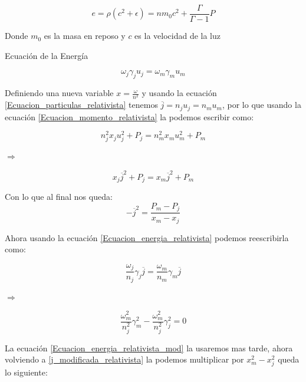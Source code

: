 \documentclass[12pt,a4paper]{book}
\begin{document}
\begin{equation}\label{Energia_densidad_fluido}
e = \rho \left( c^2+ \epsilon \right)= nm_{0}c^{2} + \frac{\Gamma}{\Gamma -1}P
\end{equation}

Donde $m_0$ es la masa en reposo y $c$ es la velocidad de la luz

Ecuación de la Energía

\begin{equation}\label{Ecuacion_energia_relativista}
\omega_j \gamma_j u_j=\omega_m \gamma_m u_m
\end{equation}

Definiendo una nueva variable $x=\frac{\omega}{n^{2}}$ y usando la ecuación \ref{Ecuacion_particulas_relativista} tenemos $\overline{j}=n_j u_j = n_m u_m$, por lo que usando  la ecuación \ref{Ecuacion_momento_relativista} la podemos escribir como:

\begin{equation*}
n_{j}^2 x_{j} u_{j}^{2} + P_{j}
=
n_{m}^2 x_{m} u_{m}^{2} + P_{m}
\end{equation*}

$\Rightarrow$

\begin{equation}
x_{j} \overline{j}^{2}+P_{j}
= 
x_{m} \overline{j}^{2}+P_{m}
\end{equation}

Con lo que al final nos queda:
\begin{equation} \label{j_modificada_relativista}
-\overline{j}^{2}=\frac{P_{m}-P_{j}}{x_{m}-x_{j}}
\end{equation}

Ahora usando la ecuación \ref{Ecuacion_energia_relativista}
podemos reescribirla como:

\begin{equation*}
\frac{\omega_j}{n_j}\gamma_j \overline{j}= \frac{\omega_m}{n_m}\gamma_m \overline{j}
\end{equation*}

$\Rightarrow$

\begin{equation} \label{Ecuacion_energia_relativista_mod}
\frac{\omega_m^2}{n_j^2}\gamma_m^2- \frac{\omega_m^2}{n_j^2}\gamma_j^2= 0
\end{equation}

La ecuación \ref{Ecuacion_energia_relativista_mod} la usaremos mas tarde, ahora volviendo a \ref{j_modificada_relativista} la podemos multiplicar por  $x_m^2-x_j^2$ queda lo siguiente:
\end{document}
